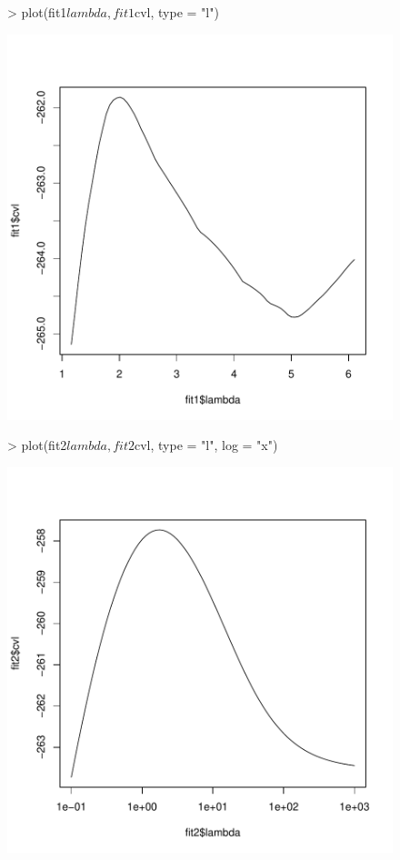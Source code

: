 \documentclass[a4paper]{article}
\begin{document}
\begin{figure}
\begin{Schunk}
\begin{Sinput}
> plot(fit1$lambda, fit1$cvl, type = "l")
\end{Sinput}
\end{Schunk}
\includegraphics{penalized-profplot1}
\end{figure}

\begin{figure}
\begin{Schunk}
\begin{Sinput}
> plot(fit2$lambda, fit2$cvl, type = "l", log = "x")
\end{Sinput}
\end{Schunk}
\includegraphics{penalized-profplot2}
\end{figure}
\end{document}
